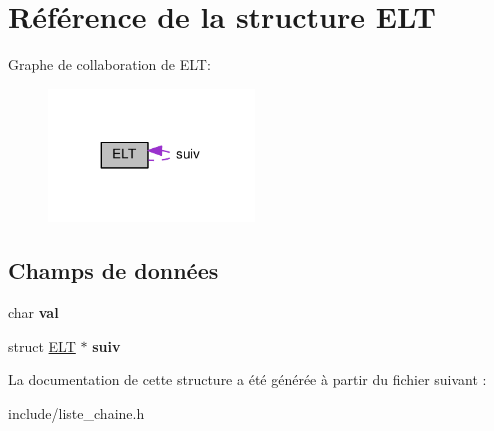 \hypertarget{structELT}{}\section{Référence de la structure E\+LT}
\label{structELT}


Graphe de collaboration de E\+LT\+:
\nopagebreak
\begin{figure}[H]
\begin{center}
\leavevmode
\includegraphics[width=155pt]{structELT__coll__graph}
\end{center}
\end{figure}
\subsection*{Champs de données}
\begin{DoxyCompactItemize}
\item 
char {\bfseries val}\hypertarget{structELT_a1fe6eedb2f252bbad8a996701512900e}{}\label{structELT_a1fe6eedb2f252bbad8a996701512900e}

\item 
struct \hyperlink{structELT}{E\+LT} $\ast$ {\bfseries suiv}\hypertarget{structELT_ae71c884a097920444cc50682340d4b31}{}\label{structELT_ae71c884a097920444cc50682340d4b31}

\end{DoxyCompactItemize}


La documentation de cette structure a été générée à partir du fichier suivant \+:\begin{DoxyCompactItemize}
\item 
include/liste\+\_\+chaine.\+h\end{DoxyCompactItemize}

